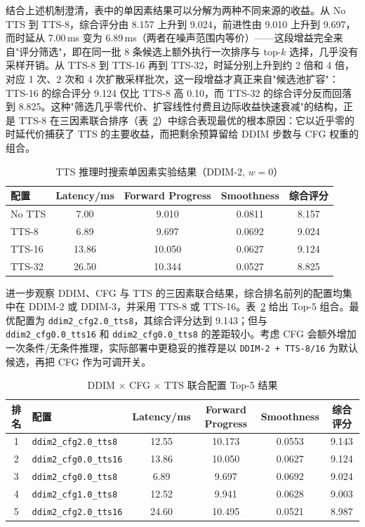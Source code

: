 结合上述机制澄清，表中的单因素结果可以分解为两种不同来源的收益。从 No TTS 到 TTS-8，综合评分由 8.157 上升到 9.024，前进性由 9.010 上升到 9.697，而时延从 7.00\,ms 变为 6.89\,ms（两者在噪声范围内等价）——这段增益完全来自"评分筛选"，即在同一批 8 条候选上额外执行一次排序与 top-$k$ 选择，几乎没有采样开销。从 TTS-8 到 TTS-16 再到 TTS-32，时延分别上升到约 2 倍和 4 倍，对应 1 次、2 次和 4 次扩散采样批次，这一段增益才真正来自"候选池扩容"：TTS-16 的综合评分 9.124 仅比 TTS-8 高 0.10，而 TTS-32 的综合评分反而回落到 8.825。这种"筛选几乎零代价、扩容线性付费且边际收益快速衰减"的结构，正是 TTS-8 在三因素联合排序（表~\ref{tab:tts-joint-top}）中综合表现最优的根本原因：它以近乎零的时延代价捕获了 TTS 的主要收益，而把剩余预算留给 DDIM 步数与 CFG 权重的组合。

\begin{table}[htbp]
    \centering
    \caption{TTS 推理时搜索单因素实验结果（DDIM-2, $w=0$）}
    \label{tab:tts-results}
    \begin{tabular}{lcccc}
        \toprule
        配置 & Latency/ms & Forward Progress & Smoothness & 综合评分 \\
        \midrule
        No TTS & 7.00 & 9.010 & 0.0811 & 8.157 \\
        TTS-8 & 6.89 & 9.697 & 0.0692 & 9.024 \\
        TTS-16 & 13.86 & 10.050 & 0.0627 & 9.124 \\
        TTS-32 & 26.50 & 10.344 & 0.0527 & 8.825 \\
        \bottomrule
    \end{tabular}
\end{table}

进一步观察 DDIM、CFG 与 TTS 的三因素联合结果，综合排名前列的配置均集中在 DDIM-2 或 DDIM-3，并采用 TTS-8 或 TTS-16。表~\ref{tab:tts-joint-top} 给出 Top-5 组合。最优配置为 \texttt{ddim2\_cfg2.0\_tts8}，其综合评分达到 9.143；但与 \texttt{ddim2\_cfg0.0\_tts16} 和 \texttt{ddim2\_cfg0.0\_tts8} 的差距较小。考虑 CFG 会额外增加一次条件/无条件推理，实际部署中更稳妥的推荐是以 \texttt{DDIM-2 + TTS-8/16} 为默认候选，再把 CFG 作为可调开关。

\begin{table}[htbp]
    \centering
    \caption{DDIM $\times$ CFG $\times$ TTS 联合配置 Top-5 结果}
    \label{tab:tts-joint-top}
    \begin{tabular}{clcccc}
        \toprule
        排名 & 配置 & Latency/ms & Forward Progress & Smoothness & 综合评分 \\
        \midrule
        1 & \texttt{ddim2\_cfg2.0\_tts8} & 12.55 & 10.173 & 0.0553 & 9.143 \\
        2 & \texttt{ddim2\_cfg0.0\_tts16} & 13.86 & 10.050 & 0.0627 & 9.124 \\
        3 & \texttt{ddim2\_cfg0.0\_tts8} & 6.89 & 9.697 & 0.0692 & 9.024 \\
        4 & \texttt{ddim2\_cfg1.0\_tts8} & 12.52 & 9.941 & 0.0628 & 9.003 \\
        5 & \texttt{ddim2\_cfg2.0\_tts16} & 24.60 & 10.495 & 0.0521 & 8.987 \\
        \bottomrule
    \end{tabular}
\end{table}

